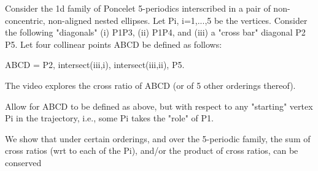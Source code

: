 Consider the 1d family of Poncelet 5-periodics interscribed in a pair of non-concentric, non-aligned nested ellipses. Let Pi, i=1,...,5 be the vertices. Consider the following "diagonals" (i) P1P3, (ii) P1P4, and (iii) a "cross bar" diagonal P2 P5. Let four collinear points ABCD be defined as follows:

ABCD = P2, intersect(iii,i), intersect(iii,ii), P5.

The video explores the cross ratio of ABCD (or of 5 other orderings thereof).

Allow for ABCD to be defined as above, but with respect to any "starting" vertex Pi in the trajectory, i.e., some Pi takes the "role" of P1.

We show that under certain orderings, and over the 5-periodic family, the sum of cross ratios (wrt to each of the Pi), and/or the product of cross ratios, can be conserved